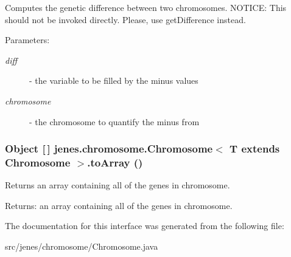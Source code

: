Computes the genetic difference between two chromosomes. NOTICE: This should not be invoked directly. Please, use getDifference instead.

\begin{Desc}
\item[Parameters:]
\begin{description}
\item[{\em diff}]- the variable to be filled by the minus values \item[{\em chromosome}]- the chromosome to quantify the minus from \end{description}
\end{Desc}
\hypertarget{interfacejenes_1_1chromosome_1_1_chromosome_3_01_t_01extends_01_chromosome_01_4_af3edb9b3b7265edf5e754ca2b41603e}{
\subsubsection[toArray]{\setlength{\rightskip}{0pt plus 5cm}Object \mbox{[}$\,$\mbox{]} jenes.chromosome.Chromosome$<$ T extends Chromosome $>$.toArray ()}}
\label{interfacejenes_1_1chromosome_1_1_chromosome_3_01_t_01extends_01_chromosome_01_4_af3edb9b3b7265edf5e754ca2b41603e}


Returns an array containing all of the genes in chromosome.

\begin{Desc}
\item[Returns:]an array containing all of the genes in chromosome. \end{Desc}


The documentation for this interface was generated from the following file:\begin{CompactItemize}
\item 
src/jenes/chromosome/Chromosome.java\end{CompactItemize}
